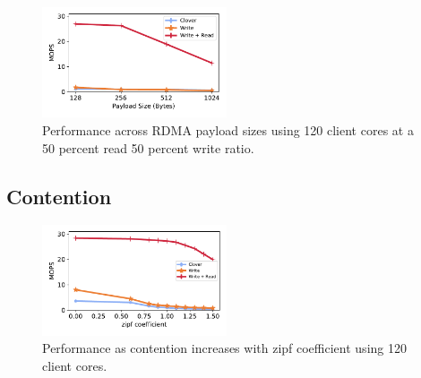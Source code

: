 \begin{figure}
  \centering
  \includegraphics[width=0.485\textwidth]{fig/packet_size.pdf}

    \caption{Performance across RDMA payload sizes using 120 client cores at a 50 percent read 50 percent write ratio.}

    \label{fig:packet_size}
\end{figure}

\subsection{Contention}
\begin{figure}
  \centering
  \includegraphics[width=0.485\textwidth]{fig/contention.pdf}

    \caption{Performance as contention increases with zipf coefficient using 120 client cores.
    }

    \label{fig:packet_size}
\end{figure}




